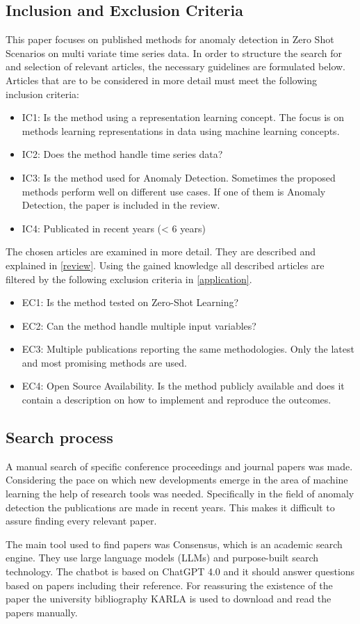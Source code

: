 \subsection{Inclusion and Exclusion Criteria}\label{criteria}
This paper focuses on published methods for anomaly detection in Zero Shot Scenarios on multi variate time series data. In order to structure the search for and selection of relevant articles, the necessary guidelines are formulated below. Articles that are to be considered in more detail must meet the following inclusion criteria:
\begin{itemize}
\item IC1: Is the method using a representation learning concept. The focus is on methods learning representations in data using machine learning concepts.
\item IC2: Does the method handle time series data?
\item IC3: Is the method used for Anomaly Detection. Sometimes the proposed methods perform well on different use cases. If one of them is Anomaly Detection, the paper is included in the review.
\item IC4: Publicated in recent years (< 6 years)
\end{itemize}
The chosen articles are examined in more detail. They are described and explained in \ref{review}. Using the gained knowledge all described articles are filtered by the following exclusion criteria in \ref{application}.
\begin{itemize}
\item EC1: Is the method tested on Zero-Shot Learning?
\item EC2: Can the method handle multiple input variables?
\item EC3: Multiple publications reporting the same methodologies. Only the latest and most promising methods are used.
\item EC4: Open Source Availability. Is the method publicly available and does it contain a description on how to implement and reproduce the outcomes.
\end{itemize}
\subsection{Search process}
A manual search of specific conference proceedings and journal papers was made. Considering the pace on which new developments emerge in the area of machine learning the help of research tools was needed. Specifically in the field of anomaly detection the publications are made in recent years. This makes it difficult to assure finding every relevant paper.

The main tool used to find papers was Consensus, which is an academic search engine. They use large language models (LLMs) and purpose-built search technology. The chatbot is based on ChatGPT 4.0 and it should answer questions based on papers including their reference. For reassuring the existence of the paper the university bibliography KARLA is used to download and read the papers manually.
